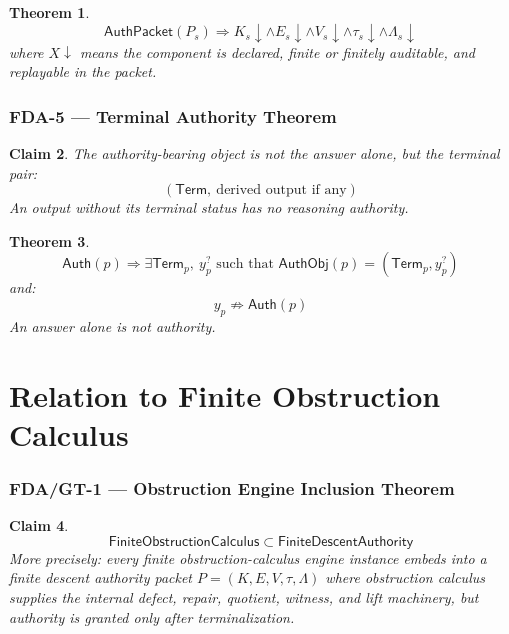 \documentclass[11pt]{article}
\newtheorem{theorem}{Theorem}[section]
\newtheorem{claim}[theorem]{Claim}
\begin{document}
\begin{theorem}
\[
\boxed{
\mathsf{AuthPacket}(P_s) \Rightarrow K_s\downarrow \wedge E_s\downarrow \wedge V_s\downarrow \wedge \tau_s\downarrow \wedge \Lambda_s\downarrow
}
\]
where \(X\downarrow\) means the component is declared, finite or finitely auditable, and replayable in the packet.
\end{theorem}

\section{FDA-5 — Terminal Authority Theorem}

\begin{claim}
The authority-bearing object is not the answer alone, but the terminal pair:
\[
\boxed{
(\mathsf{Term},\ \text{derived output if any})
}
\]
An output without its terminal status has no reasoning authority.
\end{claim}

\begin{theorem}
\[
\boxed{
\mathsf{Auth}(p) \Rightarrow \exists \mathsf{Term}_p,\ y_p^{?} \text{ such that } \mathsf{AuthObj}(p)=(\mathsf{Term}_p,y_p^{?})
}
\]
and:
\[
\boxed{
y_p\not\Rightarrow \mathsf{Auth}(p)
}
\]
An answer alone is not authority.
\end{theorem}

\part{Relation to Finite Obstruction Calculus}

\section{FDA/GT-1 — Obstruction Engine Inclusion Theorem}

\begin{claim}
\[
\boxed{ \mathsf{FiniteObstructionCalculus} \subset \mathsf{FiniteDescentAuthority} }
\]
More precisely: every finite obstruction-calculus engine instance embeds into a finite descent authority packet \(P=(K,E,V,\tau,\Lambda)\) where obstruction calculus supplies the internal defect, repair, quotient, witness, and lift machinery, but authority is granted only after terminalization.
\end{claim}
\end{document}
